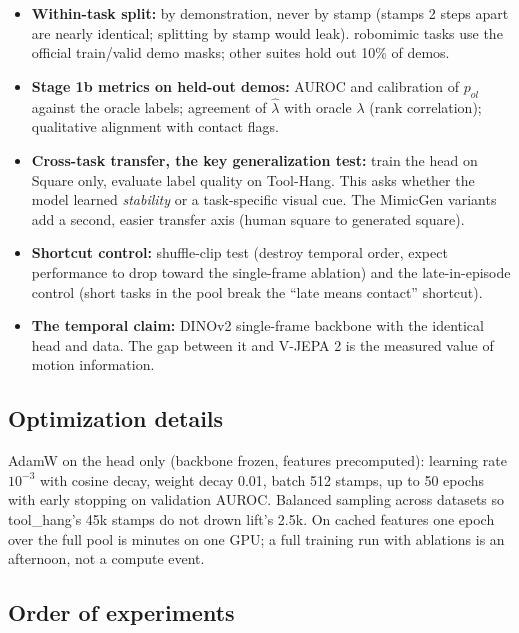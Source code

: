 \documentclass[11pt]{article}
\begin{document}
\begin{itemize}[leftmargin=2em]
  \item \textbf{Within-task split:} by demonstration, never by stamp (stamps 2
        steps apart are nearly identical; splitting by stamp would leak). robomimic
        tasks use the official train/valid demo masks; other suites hold out 10\%
        of demos.
  \item \textbf{Stage 1b metrics on held-out demos:} AUROC and calibration of
        $p_{ol}$ against the oracle labels; agreement of $\hat\lambda$ with oracle
        $\lambda$ (rank correlation); qualitative alignment with contact flags.
  \item \textbf{Cross-task transfer, the key generalization test:} train the head
        on Square only, evaluate label quality on Tool-Hang. This asks whether the
        model learned \emph{stability} or a task-specific visual cue. The MimicGen
        variants add a second, easier transfer axis (human square to generated
        square).
  \item \textbf{Shortcut control:} shuffle-clip test (destroy temporal order,
        expect performance to drop toward the single-frame ablation) and the
        late-in-episode control (short tasks in the pool break the
        ``late means contact'' shortcut).
  \item \textbf{The temporal claim:} DINOv2 single-frame backbone with the
        identical head and data. The gap between it and V-JEPA 2 is the measured
        value of motion information.
\end{itemize}

\subsection{Optimization details}

AdamW on the head only (backbone frozen, features precomputed): learning rate
$10^{-3}$ with cosine decay, weight decay 0.01, batch 512 stamps, up to 50 epochs
with early stopping on validation AUROC. Balanced sampling across datasets so
tool\_hang's 45k stamps do not drown lift's 2.5k. On cached features one epoch over
the full pool is minutes on one GPU; a full training run with ablations is an
afternoon, not a compute event.

\subsection{Order of experiments}
\end{document}
